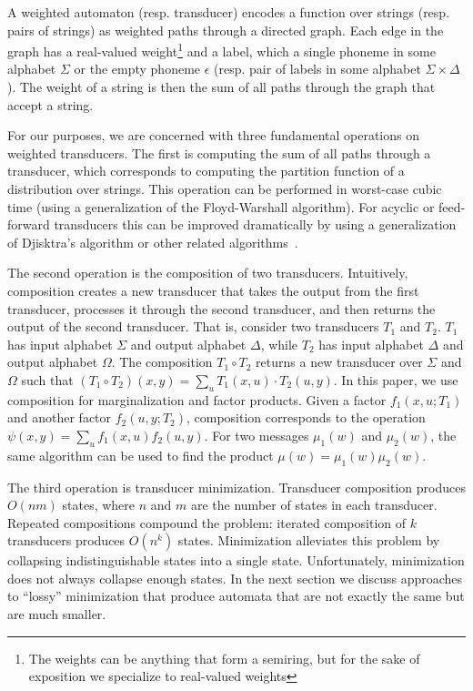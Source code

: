 \documentclass[11pt,a4paper]{article}
\begin{document}
A weighted automaton (resp. transducer) encodes a function over
strings (resp. pairs of strings) as weighted paths through a directed
graph. Each edge in the graph has a real-valued weight\footnote{The
weights can be anything that form a semiring, but for the sake of
exposition we specialize to real-valued weights} and a label, which
a single phoneme in some alphabet $\Sigma$ or the empty phoneme
$\epsilon$ (resp. pair of labels in some alphabet $\Sigma \times
\Delta$). The weight of a string is then the sum of all paths
through the graph that accept a string.

For our purposes, we are concerned with three fundamental operations
on weighted transducers. The first is computing the sum of all paths
through a transducer, which corresponds to computing the partition
function of a distribution over strings. This operation can be
performed in worst-case cubic time (using a generalization of the
Floyd-Warshall algorithm).  For acyclic or feed-forward transducers
this can be improved dramatically by using a generalization of
Djisktra's algorithm or other related algorithms~\cite{mohri09weighted}.

The second operation is the composition of two transducers.
Intuitively, composition creates a new transducer that takes the
output from the first transducer, processes it through the second
transducer, and then returns the output of the second transducer.
That is, consider two transducers $T_1$ and $T_2$. $T_1$ has input
alphabet $\Sigma$ and output alphabet $\Delta$, while $T_2$ has
input alphabet $\Delta$ and output alphabet $\Omega$. The composition
$T_1 \circ T_2$ returns a new transducer over $\Sigma$ and $\Omega$
such that $(T_1 \circ T_2)(x,y) = \sum_{u} T_1(x,u)\cdot T_2(u,y)$.
In this paper, we use composition for marginalization and factor
products. Given a factor $f_1(x,u;T_1)$ and another factor $f_2(u,y;T_2)$,
composition corresponds to the operation $\psi(x,y) = \sum_u f_1(x,u)
f_2(u,y)$. For two messages $\mu_1(w)$ and $\mu_2(w)$, the same
algorithm can be used to find the product $\mu(w) = \mu_1(w)\mu_2(w)$.

The third operation is transducer minimization. Transducer composition
produces $O(nm)$ states, where $n$ and $m$ are the number of states
in each transducer. Repeated compositions compound the problem:
iterated composition of $k$ transducers produces $O(n^k)$ states.
Minimization alleviates this problem by collapsing indistinguishable
states into a single state. Unfortunately, minimization does not
always collapse enough states. In the next section we discuss approaches
to ``lossy'' minimization that produce automata that are not exactly
the same but are much smaller.
\end{document}
